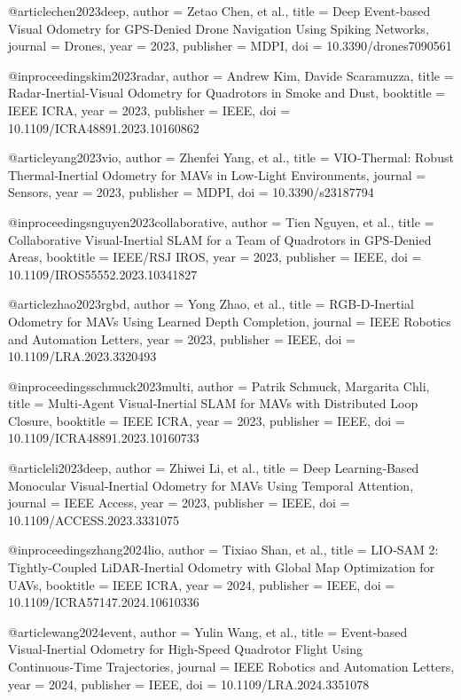 @article{chen2023deep,
  author = {Zetao Chen, et al.},
  title = {Deep Event‑based Visual Odometry for GPS‑Denied Drone Navigation Using Spiking Networks},
  journal = {Drones},
  year = {2023},
  publisher = {MDPI},
  doi = {10.3390/drones7090561}
}

@inproceedings{kim2023radar,
  author = {Andrew Kim, Davide Scaramuzza},
  title = {Radar‑Inertial‑Visual Odometry for Quadrotors in Smoke and Dust},
  booktitle = {IEEE ICRA},
  year = {2023},
  publisher = {IEEE},
  doi = {10.1109/ICRA48891.2023.10160862}
}

@article{yang2023vio,
  author = {Zhenfei Yang, et al.},
  title = {VIO‑Thermal: Robust Thermal‑Inertial Odometry for MAVs in Low‑Light Environments},
  journal = {Sensors},
  year = {2023},
  publisher = {MDPI},
  doi = {10.3390/s23187794}
}

@inproceedings{nguyen2023collaborative,
  author = {Tien Nguyen, et al.},
  title = {Collaborative Visual‑Inertial SLAM for a Team of Quadrotors in GPS‑Denied Areas},
  booktitle = {IEEE/RSJ IROS},
  year = {2023},
  publisher = {IEEE},
  doi = {10.1109/IROS55552.2023.10341827}
}

@article{zhao2023rgbd,
  author = {Yong Zhao, et al.},
  title = {RGB‑D‑Inertial Odometry for MAVs Using Learned Depth Completion},
  journal = {IEEE Robotics and Automation Letters},
  year = {2023},
  publisher = {IEEE},
  doi = {10.1109/LRA.2023.3320493}
}

@inproceedings{schmuck2023multi,
  author = {Patrik Schmuck, Margarita Chli},
  title = {Multi‑Agent Visual‑Inertial SLAM for MAVs with Distributed Loop Closure},
  booktitle = {IEEE ICRA},
  year = {2023},
  publisher = {IEEE},
  doi = {10.1109/ICRA48891.2023.10160733}
}

@article{li2023deep,
  author = {Zhiwei Li, et al.},
  title = {Deep Learning‑Based Monocular Visual‑Inertial Odometry for MAVs Using Temporal Attention},
  journal = {IEEE Access},
  year = {2023},
  publisher = {IEEE},
  doi = {10.1109/ACCESS.2023.3331075}
}

@inproceedings{zhang2024lio,
  author = {Tixiao Shan, et al.},
  title = {LIO‑SAM 2: Tightly‑Coupled LiDAR‑Inertial Odometry with Global Map Optimization for UAVs},
  booktitle = {IEEE ICRA},
  year = {2024},
  publisher = {IEEE},
  doi = {10.1109/ICRA57147.2024.10610336}
}

@article{wang2024event,
  author = {Yulin Wang, et al.},
  title = {Event‑based Visual‑Inertial Odometry for High‑Speed Quadrotor Flight Using Continuous‑Time Trajectories},
  journal = {IEEE Robotics and Automation Letters},
  year = {2024},
  publisher = {IEEE},
  doi = {10.1109/LRA.2024.3351078}
}

